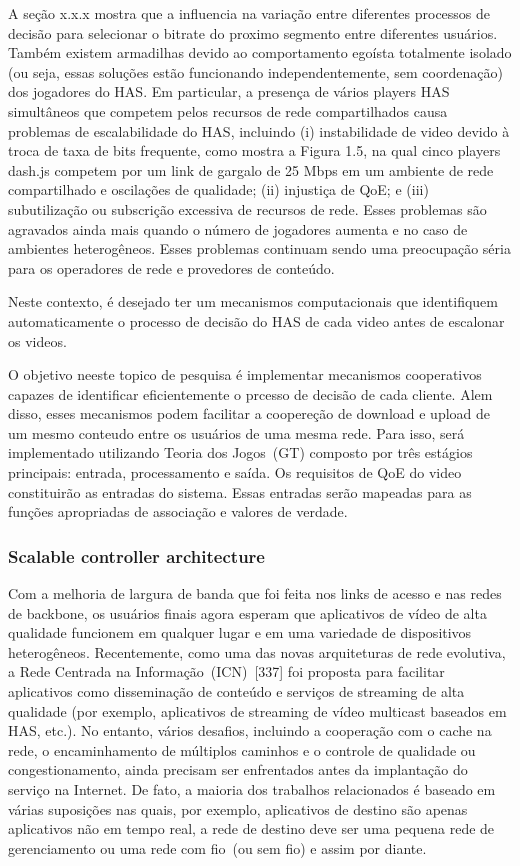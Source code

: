 A seção x.x.x mostra que a influencia na variação entre diferentes processos de decisão para selecionar o bitrate do proximo segmento entre diferentes usuários. Também existem armadilhas devido ao comportamento egoísta totalmente isolado (ou seja, essas soluções estão funcionando independentemente, sem coordenação) dos jogadores do HAS. Em particular, a presença de vários players HAS simultâneos que competem pelos recursos de rede compartilhados causa problemas de escalabilidade do HAS, incluindo (i) instabilidade de video devido à troca de taxa de bits frequente, como mostra a Figura 1.5, na qual cinco players dash.js competem por um link de gargalo de 25 Mbps em um ambiente de rede compartilhado e oscilações de qualidade; (ii) injustiça de QoE; e (iii) subutilização ou subscrição excessiva de recursos de rede. Esses problemas são agravados ainda mais quando o número de jogadores aumenta e no caso de ambientes heterogêneos. Esses problemas continuam sendo uma preocupação séria para os operadores de rede e provedores de conteúdo.

Neste contexto, é desejado ter um mecanismos computacionais que identifiquem automaticamente o processo de decisão do HAS de cada video antes de escalonar os videos.


O objetivo neeste topico de pesquisa é implementar mecanismos cooperativos capazes de identificar eficientemente o prcesso de decisão de cada cliente. Alem disso, esses mecanismos podem facilitar a coopereção de download e upload de um mesmo conteudo entre os usuários de uma mesma rede. Para isso, será implementado utilizando Teoria dos Jogos~(GT) composto por três estágios principais: entrada, processamento e saída. Os requisitos de QoE do video constituirão as entradas do sistema. Essas entradas serão mapeadas para as funções apropriadas de associação e valores de verdade.


\subsubsection{Scalable controller architecture}
\label{subsec:sca}

Com a melhoria de largura de banda que foi feita nos links de acesso e nas redes de backbone, os usuários finais agora esperam que aplicativos de vídeo de alta qualidade funcionem em qualquer lugar e em uma variedade de dispositivos heterogêneos. Recentemente, como uma das novas arquiteturas de rede evolutiva, a Rede Centrada na Informação~(ICN)~[337] foi proposta para facilitar aplicativos como disseminação de conteúdo e serviços de streaming de alta qualidade (por exemplo, aplicativos de streaming de vídeo multicast baseados em HAS, etc.). No entanto, vários desafios, incluindo a cooperação com o cache na rede, o encaminhamento de múltiplos caminhos e o controle de qualidade ou congestionamento, ainda precisam ser enfrentados antes da implantação do serviço na Internet. De fato, a maioria dos trabalhos relacionados é baseado em várias suposições nas quais, por exemplo, aplicativos de destino são apenas aplicativos não em tempo real, a rede de destino deve ser uma pequena rede de gerenciamento ou uma rede com fio~(ou sem fio) e assim por diante. 


